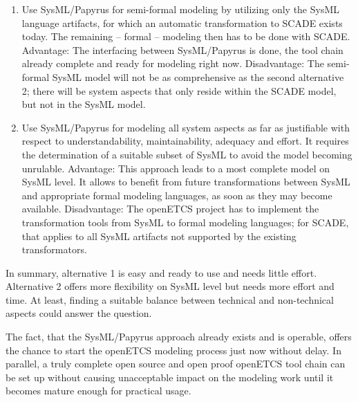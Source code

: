 \begin{enumerate}
	\item Use SysML/Papyrus for semi-formal modeling by utilizing only the SysML language artifacts, for which an automatic transformation to SCADE exists today. The remaining – formal – modeling then has to be done with SCADE. 
Advantage: The interfacing between SysML/Papyrus is done, the tool chain already complete and ready for modeling right now.
Disadvantage: The semi-formal SysML model will not be as comprehensive as the second alternative 2; there will be system aspects that only reside within the SCADE model, but not in the SysML model.
	\item Use SysML/Papyrus for modeling all system aspects as far as justifiable with respect to understandability, maintainability, adequacy and effort. It requires the determination of a suitable subset of SysML to avoid the model becoming unrulable. 
Advantage: This approach leads to a most complete model on SysML level. It allows to benefit from future transformations between SysML and appropriate formal modeling languages, as soon as they may become available. 
Disadvantage: The openETCS project has to implement the transformation tools from SysML to formal modeling languages; for SCADE, that applies to all SysML artifacts not supported by the existing transformators.
\end{enumerate}

In summary, alternative 1 is easy and ready to use and needs little effort. Alternative 2 offers more flexibility on SysML level but needs more effort and time. 
At least, finding a suitable balance between technical and non-technical aspects could answer the question.  

The fact, that the SysML/Papyrus approach already exists and is operable, offers the chance to start the openETCS modeling process just now without delay. 
In parallel, a truly complete open source and open proof openETCS tool chain can be set up without causing unacceptable impact on the modeling work until it becomes mature enough for practical usage. 

